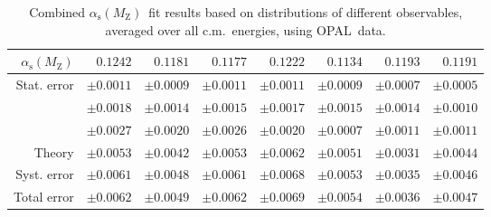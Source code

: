 \documentclass[12pt,a4paper,twoside]{article}
\newcommand{\asmz}   {\ensuremath{\alpha_{\mathrm{s}}(\mz)}}
\newcommand{\mz}     {\ensuremath{M_{\mathrm{Z}}}}
\newcommand{\Opal}{\mbox{\rm OPAL}}
\begin{document}
\begin{table}[p]
\begin{center}
{\begin{tabular}{|r||r r r r r r|| r|}
\bigstrut[b] $\asmz$
 & $0.1242$
 & $0.1181$
 & $0.1177$
 & $0.1222$
 & $0.1134$
 & $0.1193$
 & $0.1191$
 \\ 
\hline \bigstrut Stat. error
 & $\pm 0.0011$
 & $\pm 0.0009$
 & $\pm 0.0011$
 & $\pm 0.0011$
 & $\pm 0.0009$
 & $\pm 0.0007$
 & $\pm 0.0005$
 \\ 
\hline \vspace{-0.15cm}{\scriptsize Expt. error}
 & {\scriptsize $\pm 0.0018$}
 & {\scriptsize $\pm 0.0014$}
 & {\scriptsize $\pm 0.0015$}
 & {\scriptsize $\pm 0.0017$}
 & {\scriptsize $\pm 0.0015$}
 & {\scriptsize $\pm 0.0014$}
 & {\scriptsize $\pm 0.0010$}
 \\ 
\vspace{-0.15cm}{\scriptsize Hadr. error}
 & {\scriptsize $\pm 0.0027$}
 & {\scriptsize $\pm 0.0020$}
 & {\scriptsize $\pm 0.0026$}
 & {\scriptsize $\pm 0.0020$}
 & {\scriptsize $\pm 0.0007$}
 & {\scriptsize $\pm 0.0011$}
 & {\scriptsize $\pm 0.0011$}
 \\ 
{\scriptsize Theory }
 & {\scriptsize $\pm0.0053$}
 & {\scriptsize $\pm0.0042$}
 & {\scriptsize $\pm0.0053$}
 & {\scriptsize $\pm0.0062$}
 & {\scriptsize $\pm0.0051$}
 & {\scriptsize $\pm0.0031$}
 & {\scriptsize $\pm0.0044$}
 \\ 
\bigstrut[b] Syst. error
 & $\pm 0.0061$
 & $\pm 0.0048$
 & $\pm 0.0061$
 & $\pm 0.0068$
 & $\pm 0.0053$
 & $\pm 0.0035$
 & $\pm 0.0046$
 \\ 
\hline \bigstrut Total error
 & $\pm 0.0062$
 & $\pm 0.0049$
 & $\pm 0.0062$
 & $\pm 0.0069$
 & $\pm 0.0054$
 & $\pm 0.0036$
 & $\pm 0.0047$
 \\ 
%
\hline
\end{tabular}
}
\end{center}
\caption{Combined \asmz\ fit results based on distributions of 
different observables, averaged
 over all c.m.\ energies, using \Opal\ data. }
\label{tab:fitsbyobservable_opal}
\end{table}
\end{document}
